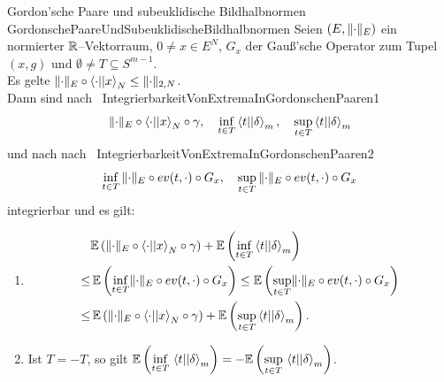 \begin{korollar}{Gordon'sche Paare und subeuklidische Bildhalbnormen}
{GordonschePaareUndSubeuklidischeBildhalbnormen}
Seien $(E, \lVert\cdot\rVert_E)$ ein normierter $\mathbb{R}$--Vektorraum, $0\neq x \in E^N$,
$G_x$ der Gauß'sche Operator zum Tupel $(x,g)$ und $\emptyset\neq T
\subseteq S^{m-1}$.\\
Es gelte $\lVert\cdot\rVert_E \circ \left\langle \cdot ||x\right\rangle_N \le \lVert\cdot\rVert_{2, N}$.\\
Dann sind nach~
{IntegrierbarkeitVonExtremaInGordonschenPaaren1}
\[\lVert\cdot\rVert_E \circ \left\langle \cdot ||x\right\rangle _N \circ \gamma, \quad
\inf_{t\in T}\left\langle t ||\delta\right\rangle_m, \quad \sup_{t\in T}\left\langle t ||\delta\right\rangle_m\]
und nach nach~
{IntegrierbarkeitVonExtremaInGordonschenPaaren2}
\[\inf_{t \in T}\, \lVert\cdot\rVert_E \circ ev(t,\cdot)\circ G_x, \quad
\sup_{t \in T}\, \lVert\cdot\rVert_E \circ ev(t,\cdot)\circ G_x \]
integrierbar und es gilt:
\begin{enumerate}[(1)]
	\item \label {GordonschePaareUndSubeuklidischeBildhalbnormen1}
\begin{align*}
& \mathbb{E}\left( \lVert\cdot\rVert_E \circ \left\langle \cdot ||x\right\rangle _N \circ \gamma\right)
	+ \mathbb{E}\left(\inf_{t\in T}\left\langle t ||\delta\right\rangle_m \right)\\
	\le &\,\mathbb{E}\left(\inf_{t \in T} \lVert\cdot\rVert_E \circ ev(t,\cdot)\circ G_x \right)
	\le \mathbb{E}\left(\sup_{t \in T} \lVert\cdot\rVert_E \circ ev(t,\cdot)\circ G_x \right)\\
	\le &\,\mathbb{E}\left( \lVert\cdot\rVert_E \circ \left\langle \cdot ||x\right\rangle _N \circ \gamma\right)
	+ \mathbb{E}\left(\sup_{t\in T}\left\langle t ||\delta\right\rangle_m \right)\text.
\end{align*}
	\item \label {GordonschePaareUndSubeuklidischeBildhalbnormen2}
	Ist $T = - T$, so gilt
	$\mathbb{E}\left(\underset{t\in T}\inf\,\left\langle t ||\delta\right\rangle_m \right)
	= - \mathbb{E}\left(\underset{t\in T}\sup\,\left\langle t ||\delta\right\rangle_m \right)$.
\end{enumerate}
\end{korollar}
